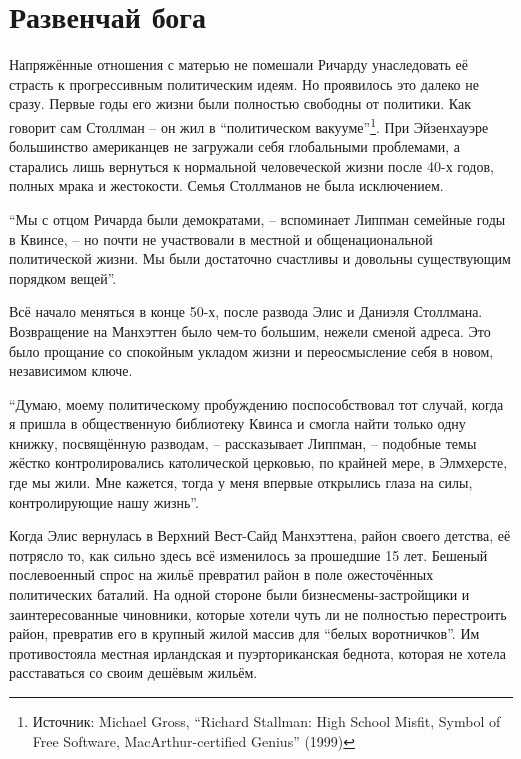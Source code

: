
\chapter{Развенчай бога}

Напряжённые отношения с матерью не помешали Ричарду унаследовать её страсть к прогрессивным политическим идеям. Но проявилось это далеко не сразу. Первые годы его жизни были полностью свободны от политики. Как говорит сам Столлман -- он жил в \enquote{политическом вакууме}\footnote{Источник: Michael Gross, \enquote{Richard Stallman: High School Misfit, Symbol of Free Software, MacArthur-certified Genius} (1999)}. При Эйзенхауэре большинство американцев не загружали себя глобальными проблемами, а старались лишь вернуться к нормальной человеческой жизни после 40-х годов, полных мрака и жестокости. Семья Столлманов не была исключением.

\enquote{Мы с отцом Ричарда были демократами, -- вспоминает Липпман семейные годы в Квинсе, -- но почти не участвовали в местной и общенациональной политической жизни. Мы были достаточно счастливы и довольны существующим порядком вещей}.

Всё начало меняться в конце 50-х, после развода Элис и Даниэля Столлмана. Возвращение на Манхэттен было чем-то большим, нежели сменой адреса. Это было прощание со спокойным укладом жизни и переосмысление себя в новом, независимом ключе.

\enquote{Думаю, моему политическому пробуждению поспособствовал тот случай, когда я пришла в общественную библиотеку Квинса и смогла найти только одну книжку, посвящённую разводам, -- рассказывает Липпман, -- подобные темы жёстко контролировались католической церковью, по крайней мере, в Элмхерсте, где мы жили. Мне кажется, тогда у меня впервые открылись глаза на силы, контролирующие нашу жизнь}.

Когда Элис вернулась в Верхний Вест-Сайд Манхэттена, район своего детства, её потрясло то, как сильно здесь всё изменилось за прошедшие 15 лет. Бешеный послевоенный спрос на жильё превратил район в поле ожесточённых политических баталий. На одной стороне были бизнесмены-застройщики и заинтересованные чиновники, которые хотели чуть ли не полностью перестроить район, превратив его в крупный жилой массив для \enquote{белых воротничков}. Им противостояла местная ирландская и пуэрториканская беднота, которая не хотела расставаться со своим дешёвым жильём.

